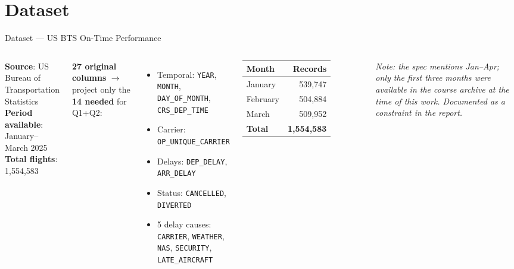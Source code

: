 \documentclass[aspectratio=169]{beamer}
\begin{document}
\section{Dataset}
\begin{frame}{Dataset --- US BTS On-Time Performance}
\begin{columns}[T]
\textbf{Source}: US Bureau of Transportation Statistics\\
\textbf{Period available}: January--March 2025\\
\textbf{Total flights}: 1{,}554{,}583

\vspace{0.5em}
\textbf{27 original columns} $\rightarrow$ project only the
\textbf{14 needed} for Q1+Q2:
\begin{itemize}\small
    \item Temporal: \texttt{YEAR}, \texttt{MONTH}, \texttt{DAY\_OF\_MONTH}, \texttt{CRS\_DEP\_TIME}
    \item Carrier: \texttt{OP\_UNIQUE\_CARRIER}
    \item Delays: \texttt{DEP\_DELAY}, \texttt{ARR\_DELAY}
    \item Status: \texttt{CANCELLED}, \texttt{DIVERTED}
    \item 5 delay causes: \texttt{CARRIER}, \texttt{WEATHER}, \texttt{NAS}, \texttt{SECURITY}, \texttt{LATE\_AIRCRAFT}
\end{itemize}

\centering
\small
\begin{tabular}{lr}
\toprule
\textbf{Month} & \textbf{Records}\\
\midrule
January  & 539{,}747\\
February & 504{,}884\\
March    & 509{,}952\\
\midrule
\textbf{Total} & \textbf{1{,}554{,}583}\\
\bottomrule
\end{tabular}

\vspace{1em}
\footnotesize\textit{Note: the spec mentions Jan--Apr; only the
first three months were available in the course archive at the
time of this work. Documented as a constraint in the report.}
\end{columns}

\end{frame}
\end{document}
